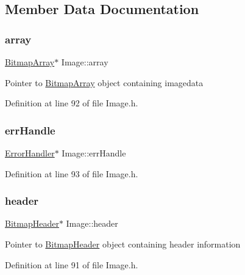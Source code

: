 \subsection{Member Data Documentation}
\mbox{\label{classImage_a1c18dd7d9eda416d44e7eb408d5b3c38}} 
\subsubsection{\texorpdfstring{array}{array}}
{\footnotesize\ttfamily \mbox{\hyperlink{classBitmapArray}{Bitmap\+Array}}$\ast$ Image\+::array\hspace{0.3cm}{\ttfamily [private]}}

Pointer to \mbox{\hyperlink{classBitmapArray}{Bitmap\+Array}} object containing imagedata 

Definition at line 92 of file Image.\+h.

\mbox{\label{classImage_a560753c20e67a544be57bba971021375}} 
\subsubsection{\texorpdfstring{errHandle}{errHandle}}
{\footnotesize\ttfamily \mbox{\hyperlink{classErrorHandler}{Error\+Handler}}$\ast$ Image\+::err\+Handle\hspace{0.3cm}{\ttfamily [private]}}



Definition at line 93 of file Image.\+h.

\mbox{\label{classImage_adaf72c2df8979eafb4031dc0384dc49f}} 
\subsubsection{\texorpdfstring{header}{header}}
{\footnotesize\ttfamily \mbox{\hyperlink{classBitmapHeader}{Bitmap\+Header}}$\ast$ Image\+::header\hspace{0.3cm}{\ttfamily [private]}}

Pointer to \mbox{\hyperlink{classBitmapHeader}{Bitmap\+Header}} object containing header information 

Definition at line 91 of file Image.\+h.

